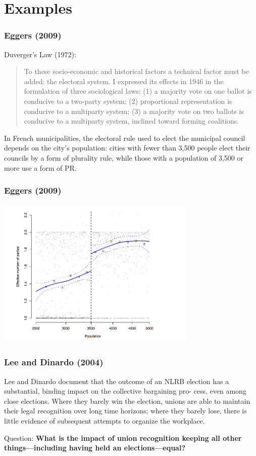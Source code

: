\documentclass{beamer}
\begin{document}
\section{Examples}

\begin{frame}
  \frametitle{Eggers (2009)}  

Duverger's Law (1972): 
\begin{quote}
  To these socio-economic and historical factors a technical factor must be added: the electoral system. I expressed its effects in 1946 in the formulation of three sociological laws: (1) a majority vote on one ballot is conducive to a two-party system; (2) proportional representation is conducive to a multiparty system; (3) a majority vote on two ballots is conducive to a multiparty system, inclined toward forming coalitions.
\end{quote}

In French municipalities, the electoral rule used to elect the municipal council depends on the city's population: cities with fewer than 3,500 people elect their councils by a form of plurality rule, while those with a population of 3,500 or more use a form of PR. 
\end{frame}

\begin{frame}
  \frametitle{Eggers (2009)}  
\includegraphics[width=9.5cm]{Eggers.png}  

\end{frame}

\begin{frame}
  \frametitle{Lee and Dinardo (2004)}
Lee and Dinardo document that the outcome of an NLRB election has a
substantial, binding impact on the collective bargaining pro- cess,
even among close elections. Where they barely win the election, unions
are able to maintain their legal recognition over long time horizons;
where they barely lose, there is little evidence of subsequent
attempts to organize the workplace.  

Question: \textbf{What is the impact of union recognition keeping all other things---including having held an elections---equal?}
\end{frame}
\end{document}
